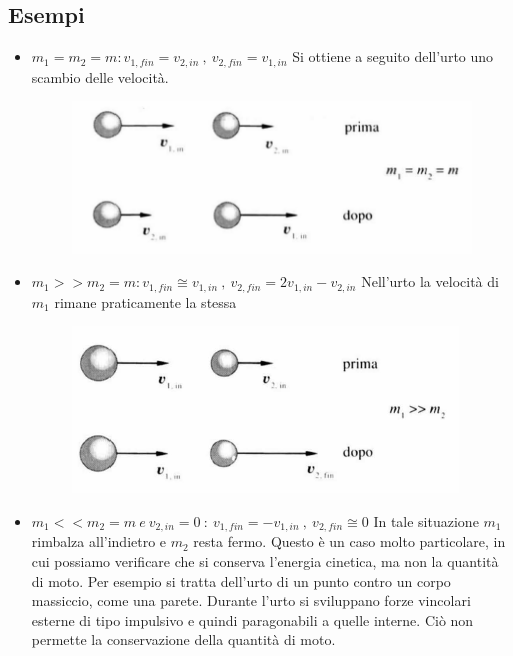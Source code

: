 \documentclass[class=book, crop=false, oneside, 12pt]{standalone}
\begin{document}
\subsection{Esempi}
\begin{itemize}
    \item \(m_1 = m_2 = m : v_{1,fin} = v_{2,in} \ , \ v_{2,fin} = v_{1,in}\) \newline
    Si ottiene a seguito dell'urto uno scambio delle velocità. 

    \begin{figure}[h]
        \includegraphics[scale=1]{urto_due_punti_materiali}
        \centering
    \end{figure}

    \item \(m_1 >> m_2 = m : v_{1,fin} \cong v_{1,in} \ , \ v_{2,fin} = 2 v_{1,in} - v_{2,in}\) \newline
    Nell'urto la velocità di \(m_1\) rimane praticamente la stessa

    \begin{figure}[h]
        \includegraphics[scale=1]{urto_due_punti_materiali_diversi}
        \centering
    \end{figure}

    \item \(m_1 << m_2 = m \ e \ v_{2,in} = 0  \ : \ v_{1,fin} = - v_{1,in} \ , \ v_{2,fin} \cong 0 \) \newline
    In tale situazione \(m_1\) rimbalza all'indietro e \(m_2\) resta fermo. 
    Questo è un caso molto particolare, in cui possiamo verificare che si conserva l'energia cinetica, ma non la quantità di moto.
    Per esempio si tratta dell'urto di un punto contro un corpo massiccio, come una parete.
    Durante l'urto si sviluppano forze vincolari esterne di tipo impulsivo e quindi paragonabili a quelle interne. 
    Ciò non permette la conservazione della quantità di moto.


\end{itemize}
\end{document}
